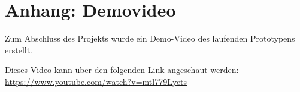 \chapter{Anhang: Demovideo} \label{appendix-demo}

Zum Abschluss des Projekts wurde ein Demo-Video des laufenden Prototypens erstellt.

Dieses Video kann über den folgenden Link angeschaut werden: \newline
\url{https://www.youtube.com/watch?v=mtl779Lyets}